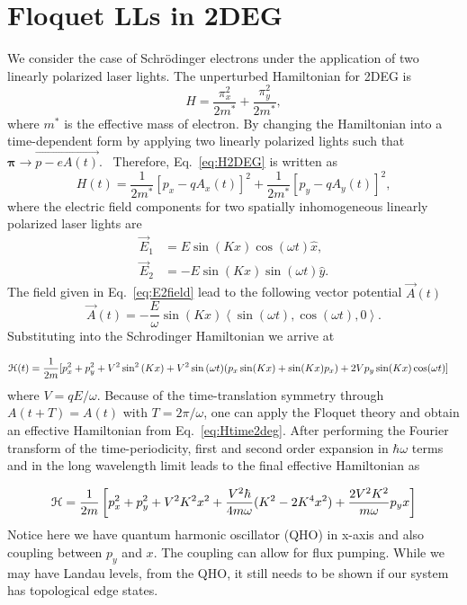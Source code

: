 \section{Floquet LLs in 2DEG}
We consider the case of Schr\"{o}dinger electrons under the application of two linearly polarized laser lights. The unperturbed Hamiltonian for 2DEG is%
\begin{equation}\label{eq:H2DEG}
H=\frac{\pi_{x}^{2}}{2m^{\ast}}+\frac{\pi_{y}^{2}}{2m^{\ast}},
\end{equation}
where $m^{\ast}$ is the effective mass of electron. By changing the Hamiltonian into a time-dependent form by applying two linearly polarized lights
such that $\bm{\pi}\rightarrow \vec{p-eA(t)}$. \ Therefore, Eq.~\eqref{eq:H2DEG} is written as%
\begin{equation}\label{eq:H2time}
H(t)=\frac{1}{2m^{\ast}}[p_{x}-qA_{x}(t)]^{2}+\frac{1}{2m^{\ast}}[p_{y} -qA_{y}(t)]^{2},
\end{equation}
where the electric field components for two spatially inhomogeneous linearly polarized laser lights are
\begin{align} \label{eq:E2field}
  \vec{E}_{1} &= E\sin{(Kx)} \cos{(\omega t)}\hat{x}, \nonumber \\
  \vec{E}_{2} &= -E\sin{(Kx)} \sin{(\omega t)}\hat{y}.
\end{align}%
The field given in Eq.~\eqref{eq:E2field} lead to the following vector potential $\vec{A}(t)$
\begin{equation}\label{eq:Avec2deg}
  \vec{A}(t)= -\dfrac{E}{\omega} \sin{(Kx)} \left\langle \sin (\omega t), \cos{(\omega t)},0 \right\rangle.
\end{equation}%
Substituting into the Schrodinger Hamiltonian we arrive at

\begin{align}\label{eq:Htime2deg}
  \mathcal{H}(t) = \dfrac{1}{2m} [ &p_x^2 + p_y^2 + V^2 \sin^2{(Kx)} + V^2 \sin{(\omega t)} (p_x \sin(Kx) + \sin(Kx) p_x) + 2Vp_y \sin(Kx) \cos(\omega t) ]
\end{align}
where $V=qE/\omega$.
Because of the time-translation symmetry through $A(t+T) = A(t)$ with $T = 2\pi/\omega$, one can apply the Floquet theory \cite{AEE, MBL, supp} and obtain an effective Hamiltonian from Eq.~\eqref{eq:Htime2deg}. After performing the Fourier transform of the time-periodicity, first and second order expansion in $\hbar \omega$ terms and in the long wavelength limit leads to the final effective Hamiltonian as

\begin{equation}\label{eq:Heff2deg}
  \mathcal{H} = \dfrac{1}{2m} \left[ p_x^2 + p_y^2 + V^2K^2x^2 + \dfrac{V^2\hbar}{4m\omega} (K^2 - 2K^4x^2) + \dfrac{2V^2K^2}{m\omega} p_y x \right]
\end{equation}
Notice here we have quantum harmonic oscillator (QHO) in x-axis and also coupling between $p_y$ and $x$.
The coupling can allow for flux pumping.
While we may have Landau levels, from the QHO, it still needs to be shown if our system has topological edge states.


